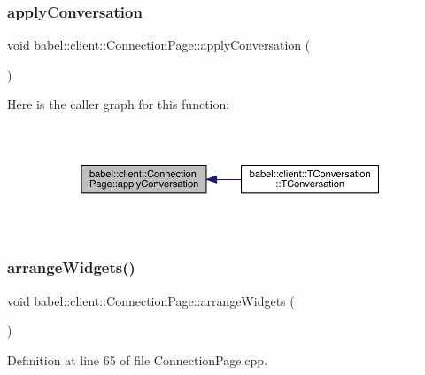 \subsubsection{\texorpdfstring{apply\+Conversation}{applyConversation}}
{\footnotesize\ttfamily void babel\+::client\+::\+Connection\+Page\+::apply\+Conversation (\begin{DoxyParamCaption}{ }\end{DoxyParamCaption})\hspace{0.3cm}{\ttfamily [signal]}}

Here is the caller graph for this function\+:\nopagebreak
\begin{figure}[H]
\begin{center}
\leavevmode
\includegraphics[width=350pt]{classbabel_1_1client_1_1_connection_page_ad70c7282778cc388376ba28c63e20f15_icgraph}
\end{center}
\end{figure}
\mbox{\label{classbabel_1_1client_1_1_connection_page_a655b6ae2012e677b172fb34e1db964bb}} 
\subsubsection{\texorpdfstring{arrange\+Widgets()}{arrangeWidgets()}}
{\footnotesize\ttfamily void babel\+::client\+::\+Connection\+Page\+::arrange\+Widgets (\begin{DoxyParamCaption}{ }\end{DoxyParamCaption})}



Definition at line 65 of file Connection\+Page.\+cpp.

\mbox{\label{classbabel_1_1client_1_1_connection_page_a7295b26d456525273cfbb29489a384d0}} 
